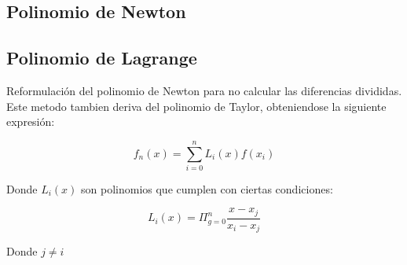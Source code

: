 \documentclass[10pt]{article}
\begin{document}
\subsection{Polinomio de Newton}

\subsection{Polinomio de Lagrange}

Reformulación del polinomio de Newton para no calcular 
las diferencias divididas. Este metodo tambien deriva del polinomio de Taylor,
obteniendose la siguiente expresión:

\begin{equation}
	f_n(x) = \sum_{i=0}^n L_i(x)f(x_i)
\end{equation}

Donde $L_i(x)$ son polinomios que cumplen con ciertas condiciones:

\begin{equation}
	L_i(x) = \Pi_{g=0}^n \dfrac{x-x_j}{x_i-x_j}
\end{equation}

Donde $j \neq i$
\end{document}
